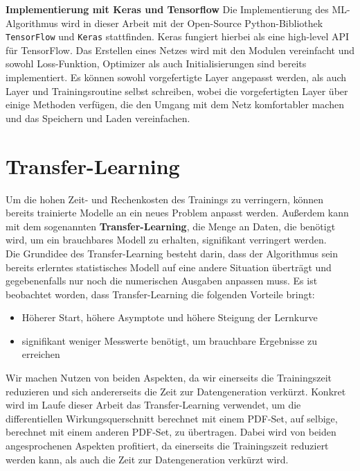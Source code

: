 \textbf{Implementierung mit Keras und Tensorflow}
Die Implementierung des ML-Algorithmus wird in dieser Arbeit mit der Open-Source Python-Bibliothek \texttt{TensorFlow} und \texttt{Keras} stattfinden. Keras fungiert hierbei als eine high-level API für TensorFlow. Das Erstellen eines Netzes wird mit den Modulen vereinfacht und sowohl Loss-Funktion, Optimizer als auch Initialisierungen sind bereits implementiert. Es können sowohl vorgefertigte Layer angepasst werden, als auch Layer und Trainingsroutine selbst schreiben, wobei die vorgefertigten Layer über einige Methoden verfügen, die den Umgang mit dem Netz komfortabler machen und das Speichern und Laden vereinfachen. 

\section{Transfer-Learning}
Um die hohen Zeit- und Rechenkosten des Trainings zu verringern, können bereits trainierte Modelle an ein neues Problem anpasst werden. Außerdem kann mit dem sogenannten \textbf{Transfer-Learning}, die Menge an Daten, die benötigt wird, um ein brauchbares Modell zu erhalten, signifikant verringert werden. \\
Die Grundidee des Transfer-Learning besteht darin, dass der Algorithmus sein bereits erlerntes statistisches Modell auf eine andere Situation überträgt und gegebenenfalls nur noch die numerischen Ausgaben anpassen muss. Es ist beobachtet worden, dass Transfer-Learning die folgenden Vorteile bringt: %
\begin{itemize}
	\setlength\itemsep{0.1cm}
	\setlength{\parskip}{0.1cm}
	\item Höherer Start, höhere Asymptote und höhere Steigung der Lernkurve
	\item signifikant weniger Messwerte benötigt, um brauchbare Ergebnisse zu erreichen
\end{itemize}
Wir machen Nutzen von beiden Aspekten, da wir einerseits die Trainingszeit reduzieren und sich andererseits die Zeit zur Datengeneration verkürzt. Konkret wird im Laufe dieser Arbeit das Transfer-Learning verwendet, um die differentiellen Wirkungsquerschnitt berechnet mit einem PDF-Set, auf selbige, berechnet mit einem anderen PDF-Set, zu übertragen. Dabei wird von beiden angesprochenen Aspekten profitiert, da einerseits die Trainingszeit reduziert werden kann, als auch die Zeit zur Datengeneration verkürzt wird.

